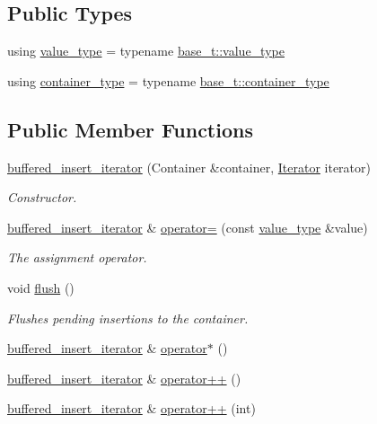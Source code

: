 \subsection*{Public Types}
\begin{DoxyCompactItemize}
\item 
using \hyperlink{classshad_1_1buffered__insert__iterator_ad7078b8c4295fb93910b095bdee49d14}{value\-\_\-type} = typename \hyperlink{classshad_1_1insert__iterator_a0a364f131900a4898acb9a8e499c6070}{base\-\_\-t\-::value\-\_\-type}
\item 
using \hyperlink{classshad_1_1buffered__insert__iterator_a901a53d64a76930ad281a96045f31a01}{container\-\_\-type} = typename \hyperlink{classshad_1_1insert__iterator_a0ab6d747c808ebbaf2e00213490585f4}{base\-\_\-t\-::container\-\_\-type}
\end{DoxyCompactItemize}
\subsection*{Public Member Functions}
\begin{DoxyCompactItemize}
\item 
\hyperlink{classshad_1_1buffered__insert__iterator_a30c2613f13dc91cfb3f1b37099dc00c5}{buffered\-\_\-insert\-\_\-iterator} (Container \&container, \hyperlink{classshad_1_1insert__iterator_a9423151fee020bc148d8c6037ecb0542}{Iterator} iterator)
\begin{DoxyCompactList}\small\item\em Constructor. \end{DoxyCompactList}\item 
\hyperlink{classshad_1_1buffered__insert__iterator}{buffered\-\_\-insert\-\_\-iterator} \& \hyperlink{classshad_1_1buffered__insert__iterator_ae52408e8adbe5dfd80c6347a3b93d017}{operator=} (const \hyperlink{classshad_1_1insert__iterator_a0a364f131900a4898acb9a8e499c6070}{value\-\_\-type} \&value)
\begin{DoxyCompactList}\small\item\em The assignment operator. \end{DoxyCompactList}\item 
void \hyperlink{classshad_1_1buffered__insert__iterator_aadf229f6aac3dbdfc204b7f6309b2e71}{flush} ()
\begin{DoxyCompactList}\small\item\em Flushes pending insertions to the container. \end{DoxyCompactList}\item 
\hyperlink{classshad_1_1buffered__insert__iterator}{buffered\-\_\-insert\-\_\-iterator} \& \hyperlink{classshad_1_1buffered__insert__iterator_a329d91c1c95a1d86fe9b3cd14032bc23}{operator$\ast$} ()
\item 
\hyperlink{classshad_1_1buffered__insert__iterator}{buffered\-\_\-insert\-\_\-iterator} \& \hyperlink{classshad_1_1buffered__insert__iterator_a270b0bd4c6bfaa0cf656c4e65c676bef}{operator++} ()
\item 
\hyperlink{classshad_1_1buffered__insert__iterator}{buffered\-\_\-insert\-\_\-iterator} \& \hyperlink{classshad_1_1buffered__insert__iterator_a326909f8fb18bdb6ae9744e3b4a189f7}{operator++} (int)
\end{DoxyCompactItemize}
